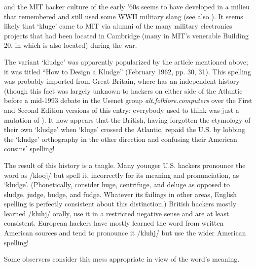  and the MIT hacker culture of the early '60s seems to have
developed in a milieu that remembered and still used some WWII military slang
(see also ). It seems likely that `kluge' came to MIT via
alumni of the many military electronics projects that had been located in
Cambridge (many in MIT's venerable Building 20, in which  is
also located) during the war.

The variant `kludge' was apparently popularized by the 
article mentioned above; it was titled ``How to Design a Kludge'' (February
1962, pp. 30, 31). This spelling was probably imported from Great Britain,
where  has an independent history (though this fact was
largely unknown to hackers on either side of the Atlantic before a mid-1993
debate in the Usenet group \textit{alt.folklore.computers} over the First and
Second Edition versions of this entry; everybody used to think
 was just a mutation of ). It now appears
that the British, having forgotten the etymology of their own `kludge' when
`kluge' crossed the Atlantic, repaid the U.S. by lobbing the `kludge'
orthography in the other direction and confusing their American cousins'
spelling!

The result of this history is a tangle. Many younger U.S. hackers pronounce the
word as /klooj/ but spell it, incorrectly for its meaning and pronunciation, as
`kludge'. (Phonetically, consider huge, centrifuge, and deluge as opposed to
sludge, judge, budge, and fudge. Whatever its failings in other areas, English
spelling is perfectly consistent about this distinction.) British hackers
mostly learned /kluhj/ orally, use it in a restricted negative sense and are at
least consistent. European hackers have mostly learned the word from written
American sources and tend to pronounce it /kluhj/ but use the wider American
spelling!

Some observers consider this mess appropriate in view of the word's meaning.

